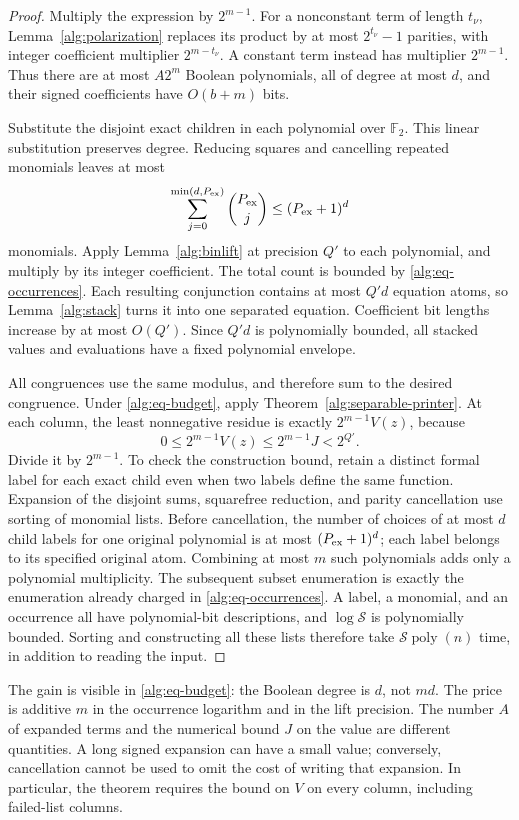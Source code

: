 \documentclass[11pt,letterpaper]{article}
\theoremstyle{definition}
\theoremstyle{remark}
\newcommand{\poly}{\operatorname{poly}}
\begin{document}
\begin{proof}
Multiply the expression by $2^{m-1}$.  For a nonconstant term of length
$t_\nu$, Lemma~\ref{alg:polarization} replaces its product by at most
$2^{t_\nu}-1$ parities, with integer coefficient multiplier
$2^{m-t_\nu}$.  A constant term instead has multiplier $2^{m-1}$.
Thus there are at most $A2^m$ Boolean polynomials, all of degree at most
$d$, and their signed coefficients have $O(b+m)$ bits.

Substitute the disjoint exact children in each polynomial over
$\mathbb F_2$.  This linear substitution preserves degree.  Reducing
squares and cancelling repeated monomials leaves at most
\[
 \sum_{j=0}^{\min(d,P_{\rm ex})}\binom{P_{\rm ex}}j
 \le(P_{\rm ex}+1)^d
\]
monomials.  Apply Lemma~\ref{alg:binlift} at precision $Q'$ to each
polynomial, and multiply by its integer coefficient.  The total count
is bounded by \eqref{alg:eq-occurrences}.  Each resulting conjunction
contains at most $Q'd$ equation atoms, so Lemma~\ref{alg:stack}
turns it into one separated equation.  Coefficient bit lengths increase
by at most $O(Q')$.  Since $Q'd$ is polynomially bounded, all stacked
values and evaluations have a fixed polynomial envelope.

All congruences use the same modulus, and therefore sum to the desired
congruence.  Under \eqref{alg:eq-budget}, apply
Theorem~\ref{alg:separable-printer}.  At each column, the least
nonnegative residue is exactly $2^{m-1}V(z)$, because
\[
 0\le 2^{m-1}V(z)\le 2^{m-1}J<2^{Q'}.
\]
Divide it by $2^{m-1}$.  To check the construction bound, retain a distinct
formal label for each exact child even when two labels define the same
function.  Expansion of the disjoint sums, squarefree reduction, and
parity cancellation use sorting of monomial lists.  Before cancellation,
the number of choices of at most $d$ child labels for one original
polynomial is at most $(P_{\rm ex}+1)^d$; each label belongs to its
specified original atom.  Combining at most $m$ such polynomials adds
only a polynomial multiplicity.
The subsequent subset enumeration is exactly the enumeration already
charged in \eqref{alg:eq-occurrences}.  A label, a monomial, and an
occurrence all have polynomial-bit descriptions, and
$\log\mathcal S$ is polynomially bounded.  Sorting and constructing
all these lists therefore take $\mathcal S\poly(n)$ time, in addition
to reading the input.
\end{proof}

The gain is visible in \eqref{alg:eq-budget}: the Boolean degree is $d$,
not $md$.  The price is additive $m$ in the occurrence logarithm and in
the lift precision.  The number $A$ of expanded terms and the numerical
bound $J$ on the value are different quantities.  A long signed expansion
can have a small value; conversely, cancellation cannot be used to omit
the cost of writing that expansion.  In particular, the theorem requires
the bound on $V$ on every column, including failed-list columns.
\end{document}
